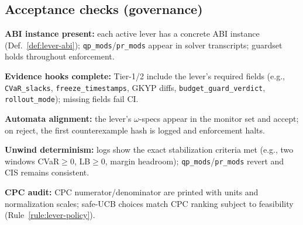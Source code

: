 \subsection{Acceptance checks (governance)}\label{subsec:gov-accept}
\begin{acceptchecks}
\item \textbf{ABI instance present:} each active lever has a concrete ABI instance (Def.~\ref{def:lever-abi}); \texttt{qp\_mods}/\texttt{pr\_mods} appear in solver transcripts; guardset holds throughout enforcement.
\item \textbf{Evidence hooks complete:} Tier-1/2 include the lever’s required fields (e.g., \texttt{CVaR\_slacks}, \texttt{freeze\_timestamps}, GKYP diffs, \texttt{budget\_guard\_verdict}, \texttt{rollout\_mode}); missing fields fail CI.
\item \textbf{Automata alignment:} the lever’s $\omega$-specs appear in the monitor set and accept; on reject, the first counterexample hash is logged and enforcement halts.
\item \textbf{Unwind determinism:} logs show the exact stabilization criteria met (e.g., two windows CVaR$\ge0$, LB$\ge0$, margin headroom); \texttt{qp\_mods}/\texttt{pr\_mods} revert and CIS remains consistent.
\item \textbf{CPC audit:} CPC numerator/denominator are printed with units and normalization scales; safe-UCB choices match CPC ranking subject to feasibility (Rule~\ref{rule:lever-policy}).
\end{acceptchecks}
